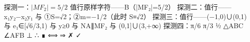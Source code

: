 \documentclass[fontset=none]{ctexart}
\begin{document}
探测一：\(|MF_2|=5/2\) 值行原样字符——B（|MF₂|=5/2）
探测二：值行——x₁y₂−x₂y₁ 与 ①S=√2；②m=−1/2（此时 S≡√2）
探测三：值行——(−1,0)∪(0,1) 与 e₁∈[√6/3,1) 与 y≥0 与 NA∥MF₂ 与 (0,1]∪(3,+∞)
探测四：π/6 π/3 ½ △ABC ∠AFB ⊥ ∴ ∎ ⟺ ⇒ ✗ ✓
\end{document}
